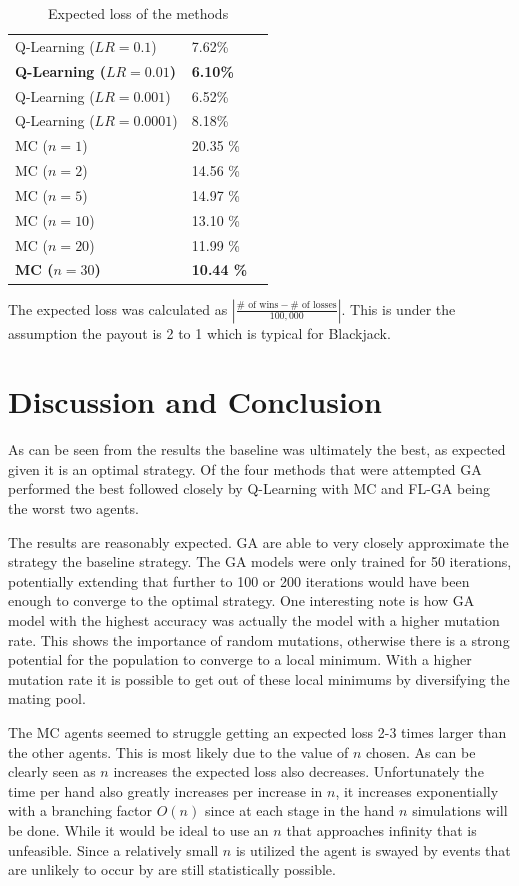 \documentclass[10pt, a4paper, twocolumn]{article}
\begin{document}
\begin{table}[H]
\begin{tabular}{llr}
		Q-Learning ($LR = 0.1$) & 7.62\%  \\
		\textbf{Q-Learning ($LR = 0.01$)} & \textbf{6.10\%}  \\
		Q-Learning ($LR = 0.001$) & 6.52\%  \\
		Q-Learning ($LR = 0.0001$) & 8.18\%  \\
		\midrule

		MC ($n = 1$) & 20.35 \%  \\
		MC ($n = 2$) & 14.56 \%  \\
		MC ($n = 5$) & 14.97 \%  \\
		MC ($n = 10$) & 13.10 \%  \\
		MC ($n = 20$) & 11.99 \%  \\
		\textbf{MC ($n = 30$)} & \textbf{10.44 \%}  \\
		\bottomrule
	\end{tabular}
	\caption{Expected loss of the methods}
\end{table}

The expected loss was calculated as $|\frac{\# \text{ of wins} - \# \text{ of losses}}{100,000}|$. This is under the assumption the payout is 2 to 1 which is typical for Blackjack.

\section{Discussion and Conclusion}

As can be seen from the results the baseline was ultimately the best, as expected given it is an optimal strategy. Of the four methods that were attempted GA performed the best followed closely by Q-Learning with MC and FL-GA being the worst two agents. 

The results are reasonably expected. GA are able to very closely approximate the strategy the baseline strategy. The GA models were only trained for 50 iterations, potentially extending that further to 100 or 200 iterations would have been enough to converge to the optimal strategy. One interesting note is how GA model with the highest accuracy was actually the model with a higher mutation rate. This shows the importance of random mutations, otherwise there is a strong potential for the population to converge to a local minimum. With a higher mutation rate it is possible to get out of these local minimums by diversifying the mating pool. 

The MC agents seemed to struggle getting an expected loss 2-3 times larger than the other agents. This is most likely due to the value of $n$ chosen. As can be clearly seen as $n$ increases the expected loss also decreases. Unfortunately the time per hand also greatly increases per increase in $n$, it increases exponentially with a branching factor $O(n)$ since at each stage in the hand $n$ simulations will be done. While it would be ideal to use an $n$ that approaches infinity that is unfeasible. Since a relatively small $n$ is utilized the agent is swayed by events that are unlikely to occur by are still statistically possible. 
\end{document}
